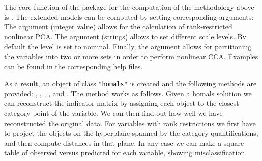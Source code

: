\documentclass[article, nojss]{jss}
\begin{document}
The core function of the package for the computation of the methodology above is . The extended models can be computed by setting corresponding arguments: The  argument (integer value) allows for the calculation of rank-restricted nonlinear PCA. The  argument (strings) allows to set different scale levels. By default the level is set to nominal. Finally, the  argument allows for partitioning the variables into two or more sets in order to perform nonlinear CCA. Examples can be found in the corresponding help files. 

As a result, an object of class \texttt{"homals"} is created and the following methods are provided: , , , ,  and . The  method works as follows. Given a homals solution we can reconstruct the indicator matrix by assigning each object to the closest category point of the variable. We can then find out how well we have reconstructed the original data. For variables with rank restrictions we first have to project the objects on the hyperplane spanned by the category quantifications, and then compute distances in that plane. In any case we can make a square table of observed versus predicted for each variable, showing misclassification. 
\end{document}
